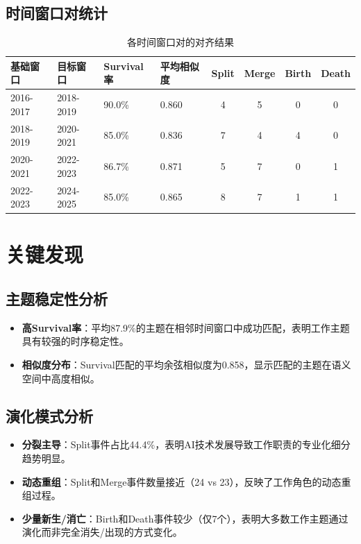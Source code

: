 \documentclass{article}
\begin{document}
\subsection{时间窗口对统计}

\begin{table}[H]
\centering
\caption{各时间窗口对的对齐结果}
\label{tab:window_stats}
\begin{tabular}{@{}llllcccc@{}}
\toprule
基础窗口 & 目标窗口 & Survival率 & 平均相似度 & Split & Merge & Birth & Death \\
\midrule
2016-2017 & 2018-2019 & 90.0\% & 0.860 & 4 & 5 & 0 & 0 \\
2018-2019 & 2020-2021 & 85.0\% & 0.836 & 7 & 4 & 4 & 0 \\
2020-2021 & 2022-2023 & 86.7\% & 0.871 & 5 & 7 & 0 & 1 \\
2022-2023 & 2024-2025 & 85.0\% & 0.865 & 8 & 7 & 1 & 1 \\
\bottomrule
\end{tabular}
\end{table}

\section{关键发现}

\subsection{主题稳定性分析}

\begin{itemize}
\item \textbf{高Survival率}：平均87.9\%的主题在相邻时间窗口中成功匹配，表明工作主题具有较强的时序稳定性。
\item \textbf{相似度分布}：Survival匹配的平均余弦相似度为0.858，显示匹配的主题在语义空间中高度相似。
\end{itemize}

\subsection{演化模式分析}

\begin{itemize}
\item \textbf{分裂主导}：Split事件占比44.4\%，表明AI技术发展导致工作职责的专业化细分趋势明显。
\item \textbf{动态重组}：Split和Merge事件数量接近（24 vs 23），反映了工作角色的动态重组过程。
\item \textbf{少量新生/消亡}：Birth和Death事件较少（仅7个），表明大多数工作主题通过演化而非完全消失/出现的方式变化。
\end{itemize}
\end{document}

